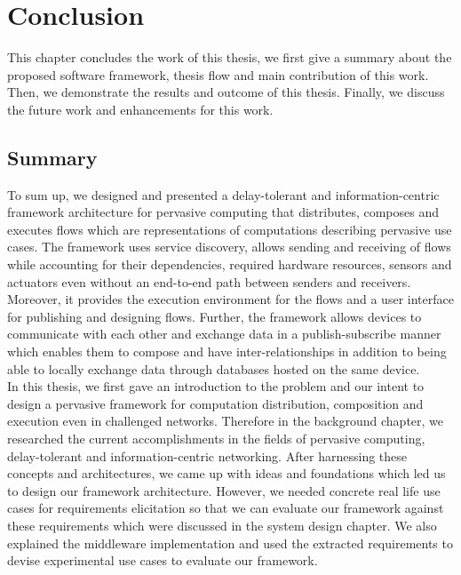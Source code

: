
\chapter{Conclusion}\label{chapter:conclusion}

This chapter concludes the work of this thesis, we first give a summary about the proposed software framework,  thesis flow and  main contribution of this work. Then, we demonstrate the results and  outcome of this thesis. Finally, we discuss the future work and enhancements for  this work. 

\section{Summary}
To sum up, we designed and presented a delay-tolerant and information-centric framework architecture for pervasive computing  that distributes, composes and executes flows which are representations of computations describing pervasive use cases. The framework uses  service discovery, allows sending and receiving of flows while accounting for their dependencies, required hardware resources, sensors and actuators even without an end-to-end path between senders and receivers. Moreover, it provides the execution environment for the flows and a user interface for publishing and designing flows. Further, the framework allows devices to communicate with each other and exchange data in a publish-subscribe manner which enables them to compose and have inter-relationships in addition to  being able to locally exchange data through databases hosted on the same device. \\

\noindent In this thesis, we first gave an introduction to the problem and our intent to design a pervasive framework for computation distribution, composition and execution even in challenged networks. Therefore in the background chapter, we researched the current accomplishments in the fields of pervasive computing, delay-tolerant and information-centric networking. After harnessing these concepts and architectures, we came up with ideas and foundations which led us to design our framework architecture. However, we needed concrete real life use cases for  requirements elicitation so that we can evaluate our framework against these requirements which were discussed in the system design chapter. We also explained the middleware implementation and used the extracted requirements to devise experimental use cases to evaluate our framework.\\

